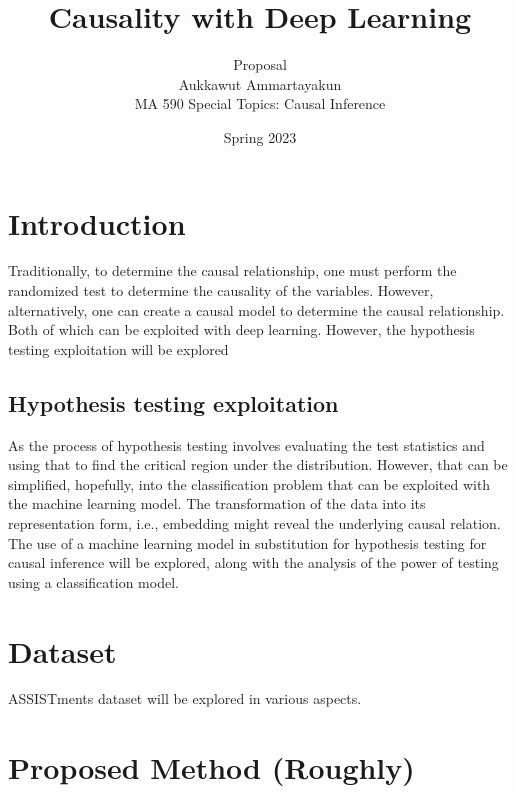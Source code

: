 \documentclass{article}
\title{Causality with Deep Learning}
\author{Proposal\\Aukkawut Ammartayakun\\MA 590 Special Topics: Causal Inference}
\date{Spring 2023}
\begin{document}
\maketitle
%
%
%            
%
%


\section{Introduction}
Traditionally, to determine the causal relationship, one must perform the randomized test to 
determine the causality of the variables. However, alternatively, one can create a causal model 
to determine the causal relationship. Both of which can be exploited with deep learning. 
However, the hypothesis testing exploitation will be explored
\subsection{Hypothesis testing exploitation}
As the process of hypothesis testing involves evaluating the test statistics and using that 
to find the critical region under the distribution. However, that can be simplified, hopefully, 
into the classification problem that can be exploited with the machine learning model. 
The transformation of the data into its representation form, i.e., embedding might reveal 
the underlying causal relation. The use of a machine learning model in substitution for 
hypothesis testing for causal inference will be explored, along with the analysis of the power 
of testing using a classification model.
\section{Dataset}
ASSISTments dataset\cite{assistment} will be explored in various aspects.
\section{Proposed Method (Roughly)}
\end{document}
